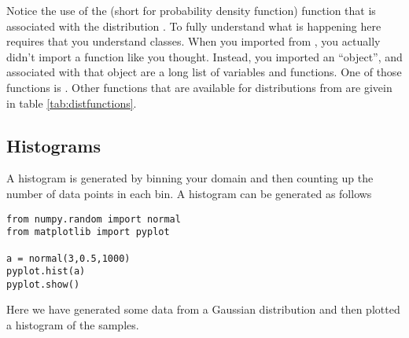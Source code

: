 Notice the use of the  (short for probability density
function) function that is associated with the distribution
.  To fully understand what is happening here requires that
you understand classes.  When you imported  from
, you actually didn't import a function like you
thought.  Instead, you imported an ``object'', and associated with
that object are a long list of variables and functions.
  One of those
functions is .  Other functions that are available for
distributions from  are givein in table
\ref{tab:distfunctions}.


\subsection*{Histograms}

A histogram is generated by binning your domain and then counting up
the number of data points in each bin.  A histogram can be generated
as follows
\begin{Verbatim}
from numpy.random import normal
from matplotlib import pyplot

a = normal(3,0.5,1000)
pyplot.hist(a)
pyplot.show()
\end{Verbatim}
 Here we have generated some data from a Gaussian distribution and then
plotted a histogram of the samples.






